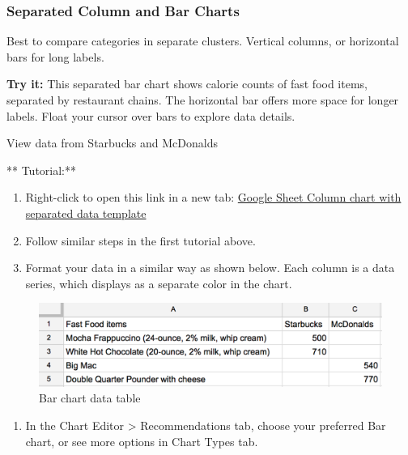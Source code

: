 \documentclass[
  english,
]{book}
\providecommand{\tightlist}{%
  \setlength{\itemsep}{0pt}\setlength{\parskip}{0pt}}
\begin{document}
\hypertarget{separated-column-and-bar-charts}{%
\subsubsection*{Separated Column and Bar Charts}\label{separated-column-and-bar-charts}}

Best to compare categories in separate clusters. Vertical columns, or horizontal bars for long labels.

\textbf{Try it:} This separated bar chart shows calorie counts of fast food items, separated by restaurant chains. The horizontal bar offers more space for longer labels. Float your cursor over bars to explore data details.

View data from Starbucks and McDonalds

** Tutorial:**

\begin{enumerate}
\def\labelenumi{\arabic{enumi})}
\item
  Right-click to open this link in a new tab: \href{https://docs.google.com/spreadsheets/d/1LGUYaVLoRcOiB8KcXb3Rn7LRj0exnUQYOy58LrkGPAk/}{Google Sheet Column chart with separated data template}
\item
  Follow similar steps in the first tutorial above.
\item
  Format your data in a similar way as shown below. Each column is a data series, which displays as a separate color in the chart.
\end{enumerate}

\begin{figure}
\centering
\includegraphics{images/05-chart/bar-chart-data.png}
\caption{Bar chart data table}
\end{figure}

\begin{enumerate}
\def\labelenumi{\arabic{enumi})}
\setcounter{enumi}{3}
\tightlist
\item
  In the Chart Editor \textgreater{} Recommendations tab, choose your preferred Bar chart, or see more options in Chart Types tab.
\end{enumerate}
\end{document}
